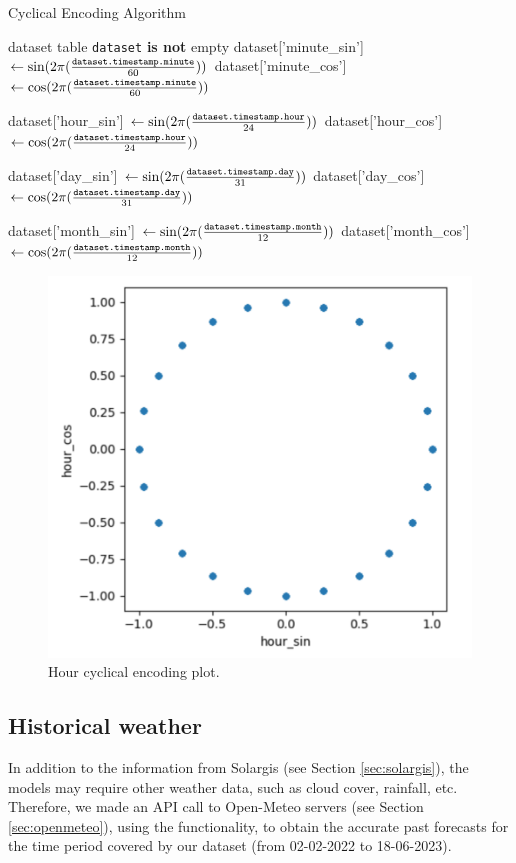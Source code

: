 \begin{algorithm}[H]
	\caption{Cyclical Encoding Algorithm}\label{alg:cyclicencoding}
	\begin{algorithmic}
		\Require dataset table
		\Ensure \texttt{dataset} \textbf{is not} empty
		\State dataset['minute\_sin'] $\gets \sin(2 \pi (\frac{\text{\texttt{dataset.timestamp.minute}}}{60}))$
		\State dataset['minute\_cos'] $\gets \cos(2 \pi (\frac{\text{\texttt{dataset.timestamp.minute}}}{60}))$


		\State dataset['hour\_sin'] $\gets \sin(2 \pi (\frac{\text{\texttt{dataset.timestamp.hour}}}{24}))$
		\State dataset['hour\_cos'] $\gets \cos(2 \pi (\frac{\text{\texttt{dataset.timestamp.hour}}}{24}))$


		\State dataset['day\_sin'] $\gets \sin(2 \pi (\frac{\text{\texttt{dataset.timestamp.day}}}{31}))$
		\State dataset['day\_cos'] $\gets \cos(2 \pi (\frac{\text{\texttt{dataset.timestamp.day}}}{31}))$

		\State dataset['month\_sin'] $\gets \sin(2 \pi (\frac{\text{\texttt{dataset.timestamp.month}}}{12}))$
		\State dataset['month\_cos'] $\gets \cos(2 \pi (\frac{\text{\texttt{dataset.timestamp.month}}}{12}))$
	\end{algorithmic}
\end{algorithm}

\begin{figure}[H]
	\centering
	\includegraphics[width=0.7\linewidth, keepaspectratio]{chapters/2_data_preprocessing/imgs/hoursincosplot.png}
	\caption{Hour cyclical encoding plot.}
	\label{fig:encodingplot}
\end{figure}

\subsection{Historical weather}
In addition to the information from Solargis (see Section \ref{sec:solargis}),
the models may require other weather data, such as cloud cover, rainfall, etc.
Therefore, we made an API call to Open-Meteo servers (see Section \ref{sec:openmeteo}), using the  functionality, to obtain the accurate past
forecasts for the time period covered by our dataset (from 02-02-2022 to 18-06-2023).

